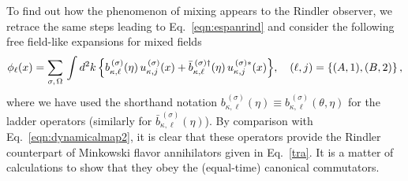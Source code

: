 \documentclass[floats,prd,aps,amssymb,nofootinbib,showkeys]{revtex4}
\newcommand{\be}{\begin{equation}}\newcommand{\ee}{\end{equation}}
\begin{document}
To find out how the phenomenon of mixing
appears to the Rindler observer, we retrace
the same steps leading to Eq.~\eqref{eqn:espanrind}
and consider the following free
field-like expansions for mixed fields~\cite{Luciano}
\be
\label{fRind}
\phi_\ell(x)=\sum_{\sigma,\hspace{0.4mm}\Omega}\,\int d^{2}k\,\Big\{{b^{\,(\sigma)}_{\kappa,\ell}}(\eta)\, u_{\kappa,j}^{\,(\sigma)}(x)+{\bar b^{\,(\sigma)\dagger}_{\kappa,\ell}}(\eta)\, u_{\kappa,j}^{\,(\sigma)*}(x) \Big\},\quad (\ell,j)=\left\{(A,1),(B,2)\right\},
\ee
where we have used the shorthand notation 
$b^{\,(\sigma)}_{\kappa,\ell}(\eta)\equiv b^{\,(\sigma)}_{\kappa,\ell}(\theta, \eta)$ for the ladder operators (similarly for $\bar b^{\,(\sigma)}_{\kappa,\ell}(\eta)$). By comparison with Eq.~\eqref{eqn:dynamicalmap2}, it is clear that these operators 
provide the Rindler counterpart of
Minkowski flavor annihilators given 
in Eq.~\eqref{tra}. It is a matter of calculations
to show that they obey the (equal-time) canonical commutators. 
\end{document}
